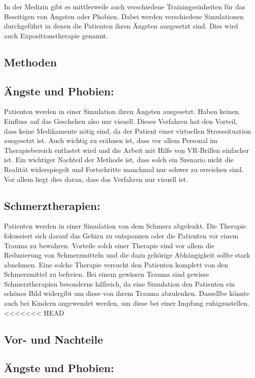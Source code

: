 
In der Medizin gibt es mittlerweile auch verschiedene Trainingseinheiten für das Beseitigen von Ängsten oder Phobien. Dabei werden verschiedene Simulationen durchgeführt in denen die Patienten ihren Ängsten ausgesetzt sind. Dies wird auch Expositionstherapie genannt.\\

\subsection{Methoden}
\subsection{Ängste und Phobien:}
Patienten werden in einer Simulation ihren Ängsten ausgesetzt. Haben keinen Einfluss auf das Geschehen also nur visuell. Dieses Verfahren hat den Vorteil, dass keine Medikamente nötig sind, da der Patient einer virtuellen Stresssituation ausgesetzt ist. Auch wichtig zu erähnen ist, dass vor allem Personal im Therapiebereich entlastet wird und die Arbeit mit Hilfe von VR-Brillen einfacher ist. Ein wichtiger Nachteil der Methode ist, dass solch ein Szenario nicht die Realität widerspiegelt und Fortschritte manchmal nur schwer zu erreichen sind. Vor allem liegt dies daran, dass das Verfahren nur visuell ist.\\

\subsection{Schmerztherapien:}
Patienten werden in einer Simulation von dem Schmerz abgelenkt. Die Therapie fokussiert sich darauf das Gehirn zu entspannen oder die Patienten vor einem Trauma zu bewahren. Vorteile solch einer Therapie sind vor allem die Reduzierung von Schmerzmitteln und die dazu gehörige Abhängigkeit sollte stark abnehmen. Eine solche Therapie versucht den Patienten komplett von den Schmerzmittel zu befreien. Bei einem gewissen Trauma sind gewisse Schmerztherapien besonderns hilfreich, da eine Simulation den Patienten ein schönes Bild widergibt um diese von ihrem Trauma abzulenken. Dassellbe könnte auch bei Kindern angewendet werden, um diese bei einer Impfung ruhigzustellen.\\
<<<<<<< HEAD

\subsection{Vor- und Nachteile}
\subsection{Ängste und Phobien:}
